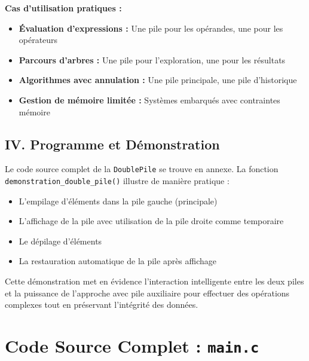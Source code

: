 \documentclass[a4paper, 11pt]{article}
\begin{document}
\textbf{Cas d'utilisation pratiques :}
\begin{itemize}
    \item \textbf{Évaluation d'expressions :} Une pile pour les opérandes, une pour les opérateurs
    \item \textbf{Parcours d'arbres :} Une pile pour l'exploration, une pour les résultats
    \item \textbf{Algorithmes avec annulation :} Une pile principale, une pile d'historique
    \item \textbf{Gestion de mémoire limitée :} Systèmes embarqués avec contraintes mémoire
\end{itemize}

\subsection{IV. Programme et Démonstration}

Le code source complet de la \texttt{DoublePile} se trouve en annexe. La fonction \texttt{demonstration\_double\_pile()} illustre de manière pratique :
\begin{itemize}
    \item L'empilage d'éléments dans la pile gauche (principale)
    \item L'affichage de la pile avec utilisation de la pile droite comme temporaire
    \item Le dépilage d'éléments
    \item La restauration automatique de la pile après affichage
\end{itemize}

Cette démonstration met en évidence l'interaction intelligente entre les deux piles et la puissance de l'approche avec pile auxiliaire pour effectuer des opérations complexes tout en préservant l'intégrité des données.

\newpage
\appendix
\section{Code Source Complet : \texttt{main.c}}

\end{document}
